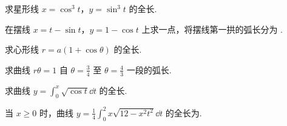 	\begin{ti}
		求星形线 $x = \cos^{3}t$，$y = \sin^{3}t$ 的全长.
	\end{ti}

	\begin{ti}
		在摆线 $x = t - \sin t$，$y = 1 - \cos t$ 上求一点，将摆线第一拱的弧长分为 .
	\end{ti}

	\begin{ti}
		求心形线 $r = a (1 + \cos \theta)$ 的全长.
	\end{ti}

	\begin{ti}
		求曲线 $r \theta = 1$ 自 $\theta = \frac{3}{4}$ 至 $\theta = \frac{4}{3}$ 一段的弧长.
	\end{ti}

	\begin{ti}
		求曲线 $y = \int_{0}^{x} \sqrt{\cos t} \dd{t}$ 的全长.
	\end{ti}

	\begin{ti}
		当 $x \geq 0$ 时，曲线 $y = \frac{1}{4} \int_{0}^{2} x \sqrt{12 - x^{2} t^{2}} \dd{t}$ 的全长为\htwo.
	\end{ti}

